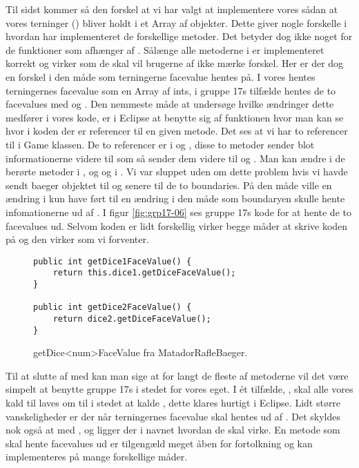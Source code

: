 Til sidst kommer så den forskel at vi har valgt at implementere vores  sådan at vores terninger () bliver holdt i et Array af  objekter. Dette giver nogle forskelle i hvordan  har implementeret de forskellige metoder. Det betyder dog ikke noget for de funktioner som afhænger af . Sålænge alle metoderne i  er implementeret korrekt og virker som de skal vil brugerne af  ikke mærke forskel. Her er der dog en forskel i den måde som terningerne facevalue hentes på. I vores  hentes terningernes facevalue som en Array af ints, i gruppe 17s tilfælde hentes de to facevalues med  og . Den nemmeste måde at undersøge hvilke ændringer dette medfører i vores kode, er i Eclipse at benytte sig af funktionen hvor man kan se hvor i koden der er referencer til en given metode. Det ses at vi har to referencer til  i Game klassen. De to referencer er i  og , disse to metoder sender blot informationerne videre til  som så sender dem videre til  og . Man kan ændre i de berørte metoder i ,  og  og i . Vi var sluppet uden om dette problem hvis vi havde sendt baeger objektet til  og senere til de to boundaries. På den måde ville en ændring i  kun have ført til en ændring i den måde som boundaryen skulle hente infomationerne ud af . I figur \vref{fig:grp17-06} ses gruppe 17s kode for at hente de to facevalues ud. Selvom koden er lidt forskellig virker begge måder at skrive koden på og den virker som vi forventer.
\begin{figure}
\centering
\caption{getDice<num>FaceValue fra MatadorRafleBaeger.\cite{grp17}}\label{fig:grp17-06}
\begin{verbatim}
public int getDice1FaceValue() {
    return this.dice1.getDiceFaceValue();
}

public int getDice2FaceValue() {
    return dice2.getDiceFaceValue();
}
\end{verbatim}
\end{figure}

Til at slutte af med kan man sige at for langt de fleste af metoderne vil det være simpelt at benytte gruppe 17s  i stedet for vores eget. I ét tilfælde, , skal alle vores kald til  laves om til i stedet at kalde , dette klares hurtigt i Eclipse. Lidt større vanskeligheder er der når terningernes facevalue skal hentes ud af . Det skyldes nok også at med ,  og  ligger der i navnet hvordan de skal virke. En metode som skal hente facevalues ud er tilgengæld meget åben for fortolkning og kan implementeres på mange forskellige måder.